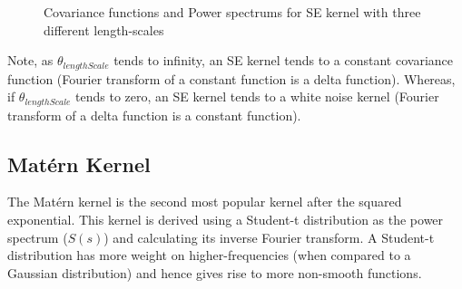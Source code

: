 \begin{figure}[!ht]
  \centering
    \quad
{}\quad
\caption{Covariance functions and Power spectrums for SE kernel with three different length-scales}
       \label{figKernelAndPowerSpectrumsSE}
\end{figure}

Note, as $\theta_{lengthScale}$ tends to infinity, an SE kernel tends to a constant covariance function (Fourier transform of a constant function is a delta function). Whereas, if $\theta_{lengthScale}$ tends to zero, an SE kernel tends to a white noise kernel (Fourier transform of a delta function is a constant function).

\subsection{Mat\'ern Kernel}\label{subsecCh4MaternKernel}
The Mat\'ern kernel is the second most popular kernel after the squared exponential. This kernel is derived using a Student-t distribution as the power spectrum ($S(s)$) and calculating its inverse Fourier transform. A Student-t distribution has more weight on higher-frequencies (when compared to a Gaussian distribution) and hence gives rise to more non-smooth functions. 

